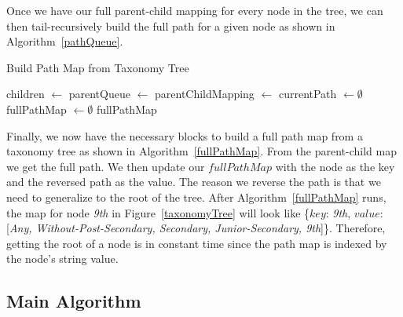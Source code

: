 \documentclass[11pt]{article}       %
\begin{document}
Once we have our full parent-child mapping for every node in the tree, we can then tail-recursively build the full path for a given node as shown in Algorithm~\ref{pathQueue}. 

\begin{algorithm}[h]
\label{fullPathMap}
\caption{Build Path Map from Taxonomy Tree}
\BlankLine
children $\leftarrow$ \;
parentQueue $\leftarrow$ 
\BlankLine
parentChildMapping $\leftarrow$ \;
currentPath $\leftarrow \emptyset$\;
fullPathMap $\leftarrow \emptyset$\;
\BlankLine
{}
\BlankLine
\KwRet fullPathMap

\end{algorithm}

Finally, we now have the necessary blocks to build a full path map from a taxonomy tree as shown in Algorithm~\ref{fullPathMap}. From the parent-child map we get the full path. We then update our $fullPathMap$ with the node as the key and the reversed path as the value. The reason we reverse the path is that we need to generalize to the root of the tree. After Algorithm~\ref{fullPathMap} runs, the map for node \emph{9th} in Figure~\ref{taxonomyTree} will look like \{$key$: \emph{9th}, $value$: [\emph{Any, Without-Post-Secondary, Secondary, Junior-Secondary, 9th}]\}. Therefore, getting the root of a node is in constant time since the path map is indexed by the node's string value.

\subsection{Main Algorithm}
\end{document}
